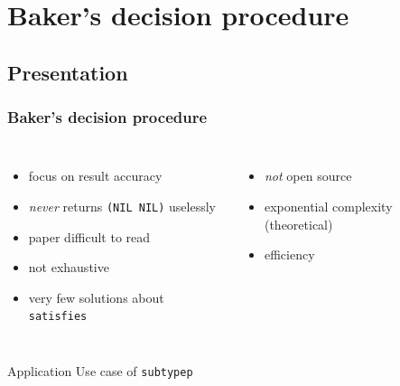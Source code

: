 \documentclass[aspectratio=169]{beamer}
\renewcommand\code[1]{\texttt{#1}}
\newcommand\rarr{\ensuremath{\rightarrow}}
\newcommand\plus{{\color{watchOS-blue}\faPlus}}
\newcommand\minus{{\color{watchOS-red}\faMinus}}
\newcommand\maybe{{\color{watchOS-purple}\faQuestion}}
\begin{document}
\section{Baker's decision procedure}
\subsection{Presentation}

\begin{frame}
  \frametitle{Baker's decision procedure}
  \begin{columns}
    \column{.45\paperwidth}
    \begin{itemize}
    \item[\plus] focus on result accuracy
    \item[\plus] \emph{never} returns \code{(NIL NIL)} uselessly
      \pause
    \item[\minus] paper difficult to read
    \item[\minus] not exhaustive
    \item[\minus] very few solutions about \code{satisfies}
    \end{itemize}

    \pause
    \column{.45\paperwidth}
    \begin{itemize}
    \item[\minus] \emph{not} open source
    \item[\minus] exponential complexity (theoretical)
    \item[\maybe] efficiency%
    \end{itemize}
  \end{columns}
\end{frame}

\begin{sectionframe}{Application}
  Use case of \code{subtypep}
\end{sectionframe}
\end{document}
